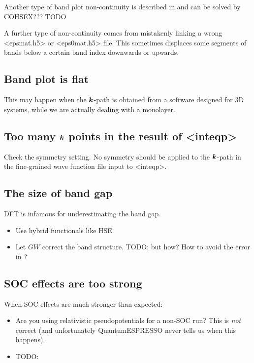 \documentclass[hyperref, a4paper, 12pt]{report}
\def\texttt#1{<#1>}%
\newcommand{\shortcode}[1]{\texttt{#1}}
\begin{document}
Another type of band plot non-continuity is described in \cite{berger2020potential} 
and can be solved by COHSEX??? TODO

A further type of non-continuity comes from mistakenly linking a wrong \shortcode{epsmat.h5} 
or \shortcode{eps0mat.h5} file.
This sometimes displaces some segments of bands below a certain band index downwards or upwards.

\subsection{Band plot is flat}

This may happen when the $\vb*{k}$-path is obtained 
from a software designed for 3D systems, 
while we are actually dealing with a monolayer.

\subsection{Too many $\vb*{k}$ points in the result of \shortcode{inteqp}}

Check the symmetry setting. No symmetry should be applied to the $\vb*{k}$-path in the fine-grained wave function file input to \shortcode{inteqp}.

\subsection{The size of band gap}\label{sec:band-gap-problem}

DFT is infamous for underestimating the band gap.

\begin{itemize}
    \item Use hybrid functionals like HSE.
    \item Let $GW$ correct the band structure. TODO: but how? How to avoid the error in ?
\end{itemize}

\subsection{SOC effects are too strong}

When SOC effects are much stronger than expected: 
\begin{itemize}
    \item Are you using relativistic pseudopotentials for a non-SOC run?
        This is \emph{not} correct 
        (and unfortunately QuantumESPRESSO never tells us when this happens).
    \item TODO: 
\end{itemize}
\end{document}
